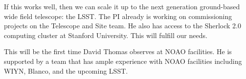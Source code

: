 \documentclass[11pt]{article}
\begin{document}
If this works well, then we can scale it up to the next generation ground-based wide field telescope: the LSST. The PI already is working on commissioning projects on the Telescope and Site team. He also has access to the Sherlock 2.0 computing cluster at Stanford University. This will fulfill our needs.

%
%
%
%
%


%

\thepast

This will be the first time David Thomas observes at NOAO facilities. He is supported by a team that has ample experience with NOAO facilities including WIYN, Blanco, and the upcoming LSST. 


%

\end{document}
